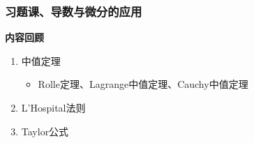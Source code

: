 \begin{frame}
	\frametitle{习题课、导数与微分的应用}
	\linespread{1.5}
	{\bf 内容回顾}
	\begin{enumerate}
	    \item 中值定理
	    \begin{itemize}
	      \item Rolle定理、Lagrange中值定理、Cauchy中值定理
	    \end{itemize}
	    \item L'Hospital法则
	    \item Taylor公式
	\end{enumerate}
\end{frame}





